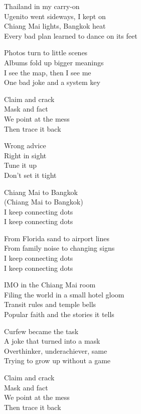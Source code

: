 \begin{lyrics}

Thailand in my carry-on\\
Ugenito went sideways, I kept on\\
Chiang Mai lights, Bangkok heat\\
Every bad plan learned to dance on its feet

Photos turn to little scenes\\
Albums fold up bigger meanings\\
I see the map, then I see me\\
One bad joke and a system key

Claim and crack\\
Mask and fact\\
We point at the mess\\
Then trace it back

Wrong advice\\
Right in sight\\
Tune it up\\
Don’t set it tight

Chiang Mai to Bangkok\\
(Chiang Mai to Bangkok)\\
I keep connecting dots\\
I keep connecting dots

From Florida sand to airport lines\\
From family noise to changing signs\\
I keep connecting dots\\
I keep connecting dots

IMO in the Chiang Mai room\\
Filing the world in a small hotel gloom\\
Transit rules and temple bells\\
Popular faith and the stories it tells

Curfew became the task\\
A joke that turned into a mask\\
Overthinker, underachiever, same\\
Trying to grow up without a game

Claim and crack\\
Mask and fact\\
We point at the mess\\
Then trace it back


\end{lyrics}
